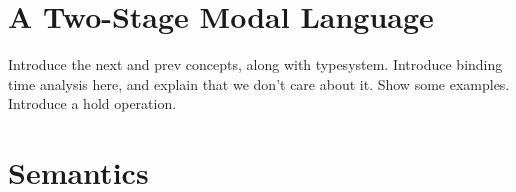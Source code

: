 

\section{A Two-Stage Modal Language}

Introduce the next and prev concepts, along with typesystem.  Introduce binding time analysis here, and explain that we don't care about it.  Show some examples.  Introduce a hold operation.

\section{Semantics}


